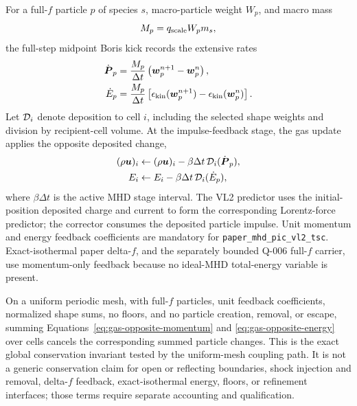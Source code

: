 \documentclass[twocolumn]{aastex701}
\newcommand{\runtime}{\texttt{paper\_mhd\_pic\_vl2\_tsc}\xspace}
\begin{document}
For a full-$f$ particle $p$ of species $s$, macro-particle weight $W_p$, and
macro mass
\begin{equation}
M_p=q_{\rm scale}W_p m_s,
\label{eq:macro-mass}
\end{equation}
the full-step midpoint Boris kick records the extensive rates
\begin{align}
\dot{\boldsymbol{P}}_p &=
\frac{M_p}{\Delta t}
\left(\boldsymbol{w}^{n+1}_p-\boldsymbol{w}^{n}_p\right),
\label{eq:particle-momentum-rate}\\
\dot{E}_p &=
\frac{M_p}{\Delta t}
\left[\epsilon_{\rm kin}(\boldsymbol{w}^{n+1}_p)
      -\epsilon_{\rm kin}(\boldsymbol{w}^{n}_p)\right].
\label{eq:particle-energy-rate}
\end{align}
Let ${\cal D}_i$ denote deposition to cell $i$, including the selected shape
weights and division by recipient-cell volume. At the impulse-feedback stage,
the gas update applies the opposite deposited change,
\begin{align}
(\rho\boldsymbol{u})_i &\leftarrow
(\rho\boldsymbol{u})_i-\beta\Delta t\,
{\cal D}_i(\dot{\boldsymbol{P}}_p),
\label{eq:gas-opposite-momentum}\\
E_i &\leftarrow E_i-\beta\Delta t\,{\cal D}_i(\dot{E}_p),
\label{eq:gas-opposite-energy}
\end{align}
where $\beta\Delta t$ is the active MHD stage interval. The VL2 predictor uses
the initial-position deposited charge and current to form the corresponding
Lorentz-force predictor; the corrector consumes the deposited particle
impulse. Unit momentum and energy feedback coefficients are mandatory for
\runtime. Exact-isothermal paper delta-$f$, and the separately bounded Q-006
full-$f$ carrier, use momentum-only feedback because no ideal-MHD total-energy
variable is present.

On a uniform periodic mesh, with full-$f$ particles, unit feedback
coefficients, normalized shape sums, no floors, and no particle creation,
removal, or escape, summing Equations~\ref{eq:gas-opposite-momentum} and
\ref{eq:gas-opposite-energy} over cells cancels the corresponding summed
particle changes. This is the exact global conservation invariant tested by
the uniform-mesh coupling path. It is not a generic conservation claim for
open or reflecting boundaries, shock injection and removal, delta-$f$
feedback, exact-isothermal energy, floors, or refinement interfaces; those
terms require separate accounting and qualification.
\end{document}
